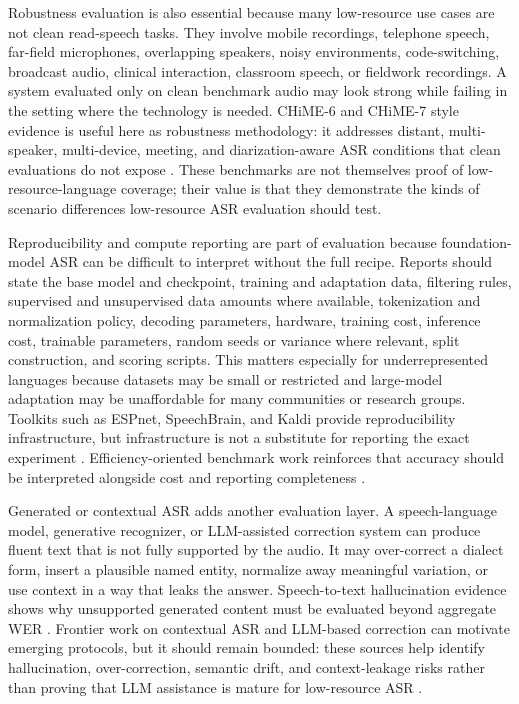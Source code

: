 \documentclass[pdflatex,sn-basic,iicol]{sn-jnl}
\theoremstyle{thmstyleone}
\theoremstyle{thmstyletwo}
\theoremstyle{thmstylethree}
\begin{document}
Robustness evaluation is also essential because many low-resource use cases are not clean read-speech tasks. They involve mobile recordings, telephone speech, far-field microphones, overlapping speakers, noisy environments, code-switching, broadcast audio, clinical interaction, classroom speech, or fieldwork recordings. A system evaluated only on clean benchmark audio may look strong while failing in the setting where the technology is needed. CHiME-6 and CHiME-7 style evidence is useful here as robustness methodology: it addresses distant, multi-speaker, multi-device, meeting, and diarization-aware ASR conditions that clean evaluations do not expose \citep{watanabe2020chime6,cornell2023chime7}. These benchmarks are not themselves proof of low-resource-language coverage; their value is that they demonstrate the kinds of scenario differences low-resource ASR evaluation should test.

Reproducibility and compute reporting are part of evaluation because foundation-model ASR can be difficult to interpret without the full recipe. Reports should state the base model and checkpoint, training and adaptation data, filtering rules, supervised and unsupervised data amounts where available, tokenization and normalization policy, decoding parameters, hardware, training cost, inference cost, trainable parameters, random seeds or variance where relevant, split construction, and scoring scripts. This matters especially for underrepresented languages because datasets may be small or restricted and large-model adaptation may be unaffordable for many communities or research groups. Toolkits such as ESPnet, SpeechBrain, and Kaldi provide reproducibility infrastructure, but infrastructure is not a substitute for reporting the exact experiment \citep{watanabe2018espnet,ravanelli2021speechbrain,povey2011kaldi}. Efficiency-oriented benchmark work reinforces that accuracy should be interpreted alongside cost and reporting completeness \citep{feng2022superbslt}.

Generated or contextual ASR adds another evaluation layer. A speech-language model, generative recognizer, or LLM-assisted correction system can produce fluent text that is not fully supported by the audio. It may over-correct a dialect form, insert a plausible named entity, normalize away meaningful variation, or use context in a way that leaks the answer. Speech-to-text hallucination evidence shows why unsupported generated content must be evaluated beyond aggregate WER \citep{koenecke2024carelesswhisper}. Frontier work on contextual ASR and LLM-based correction can motivate emerging protocols, but it should remain bounded: these sources help identify hallucination, over-correction, semantic drift, and context-leakage risks rather than proving that LLM assistance is mature for low-resource ASR \citep{ma2024asrerrorcorrection,koudounas2025shallow,wang2025contextasrbench}.
\end{document}

